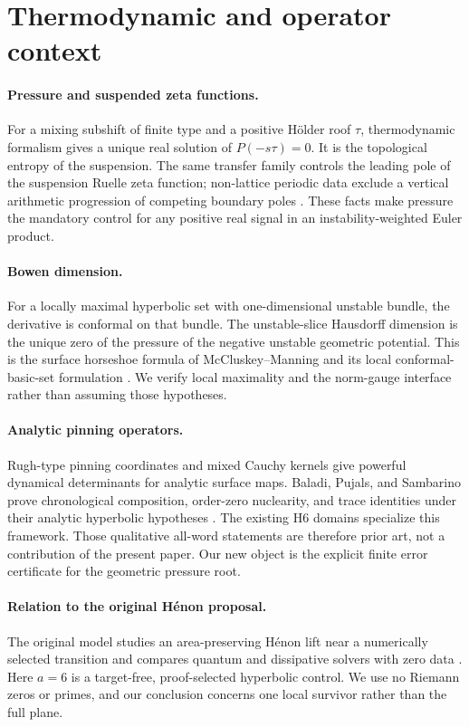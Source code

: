 \section{Thermodynamic and operator context}
\label{sec:context}

\paragraph{Pressure and suspended zeta functions.}
For a mixing subshift of finite type and a positive H\"older roof \(\tau\),
thermodynamic formalism gives a unique real solution of
\(P(-s\tau)=0\).  It is the topological entropy of the suspension.  The same
transfer family controls the leading pole of the suspension Ruelle zeta
function; non-lattice periodic data exclude a vertical arithmetic progression
of competing boundary poles \citep{Bowen1975,ParryPollicott1990,Ruelle1976}.
These facts make pressure the mandatory control for any positive real signal
in an instability-weighted Euler product.

\paragraph{Bowen dimension.}
For a locally maximal hyperbolic set with one-dimensional unstable bundle,
the derivative is conformal on that bundle.  The unstable-slice Hausdorff
dimension is the unique zero of the pressure of the negative unstable
geometric potential.  This is the surface horseshoe formula of
McCluskey--Manning and its local conformal-basic-set formulation
\citep{McCluskeyManning1983,Manning1985Erratum,PesinSadovskaya2001,Pesin1997,Barreira2013}.
We verify local
maximality and the norm-gauge interface rather than assuming those
hypotheses.

\paragraph{Analytic pinning operators.}
Rugh-type pinning coordinates and mixed Cauchy kernels give powerful
dynamical determinants for analytic surface maps.  Baladi, Pujals, and
Sambarino prove chronological composition, order-zero nuclearity, and trace
identities under their analytic hyperbolic hypotheses
\citep{BaladiPujalsSambarino2005}.  The existing H6 domains specialize this
framework.  Those qualitative all-word statements are therefore prior art,
not a contribution of the present paper.  Our new object is the explicit
finite error certificate for the geometric pressure root.

\paragraph{Relation to the original H\'enon proposal.}
The original model studies an area-preserving H\'enon lift near a numerically
selected transition and compares quantum and dissipative solvers with zero
data \citep{Wang2026HenonModel}.  Here \(a=6\) is a target-free,
proof-selected hyperbolic control.  We use no Riemann zeros or primes, and our
conclusion concerns one local survivor rather than the full plane.
